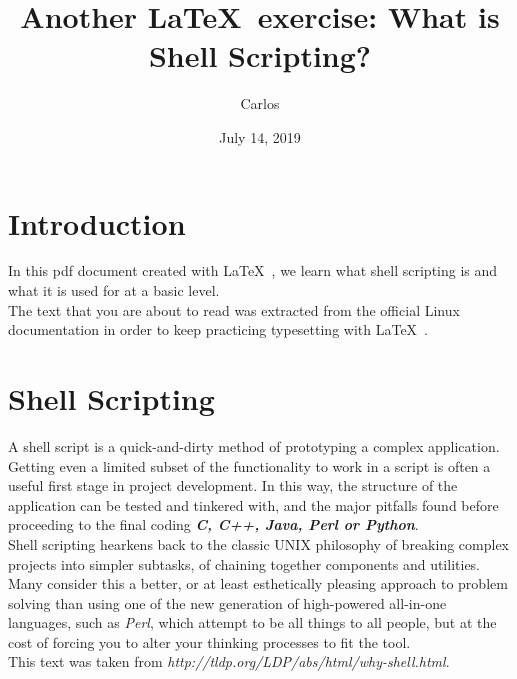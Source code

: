 \documentclass [a4paper, 11pt]{article}
\begin{document}
\title{Another \LaTeX\ exercise: What is Shell Scripting?}
\author{Carlos}
\date{July 14, 2019}
\maketitle

\section{Introduction}
In this pdf document created with \LaTeX\ , we learn what
shell scripting is and what it is used for at a basic
level.
\\ %

The text that you are about to read was extracted from the
official Linux documentation in order to keep practicing
typesetting with \LaTeX\ .

\section{Shell Scripting}
A shell script is a quick-and-dirty method of prototyping
a complex application. Getting even a limited subset of
the functionality to work in a script is often a useful
first stage in project development. In this way, the
structure of the application can be tested and tinkered with,
and the major pitfalls found before proceeding to the final
coding \textit{\textbf{C, C++, Java, Perl or Python}}.
\\ %

Shell scripting hearkens back to the classic UNIX philosophy
of breaking complex projects into simpler subtasks, of chaining
together components and utilities. Many consider this a better,
or at least esthetically pleasing approach to problem solving
than using one of the new generation of high-powered 
all-in-one languages, such as \emph{Perl}, which attempt to be
all things to all people, but at the cost of forcing you to
alter your thinking processes to fit the tool.\\
This text was taken from \emph{http://tldp.org/LDP/abs/html/why-shell.html}.
\end{document}
